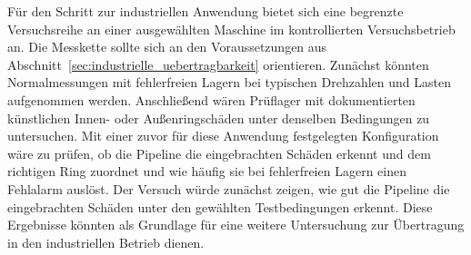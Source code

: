 Für den Schritt zur industriellen Anwendung bietet sich eine begrenzte
Versuchsreihe an einer ausgewählten Maschine im kontrollierten
Versuchsbetrieb an. Die Messkette sollte sich an den Voraussetzungen aus
Abschnitt~\ref{sec:industrielle_uebertragbarkeit} orientieren. Zunächst
könnten Normalmessungen mit fehlerfreien Lagern bei typischen Drehzahlen
und Lasten aufgenommen werden. Anschließend wären Prüflager mit
dokumentierten künstlichen Innen- oder Außenringschäden unter denselben
Bedingungen zu untersuchen. Mit einer zuvor für diese Anwendung
festgelegten Konfiguration wäre zu prüfen, ob die Pipeline die
eingebrachten Schäden erkennt und dem richtigen Ring zuordnet und wie
häufig sie bei fehlerfreien Lagern einen Fehlalarm auslöst. Der Versuch
würde zunächst zeigen, wie gut die Pipeline die eingebrachten Schäden
unter den gewählten Testbedingungen erkennt. Diese Ergebnisse könnten
als Grundlage für eine weitere Untersuchung zur Übertragung in den industriellen Betrieb dienen.
